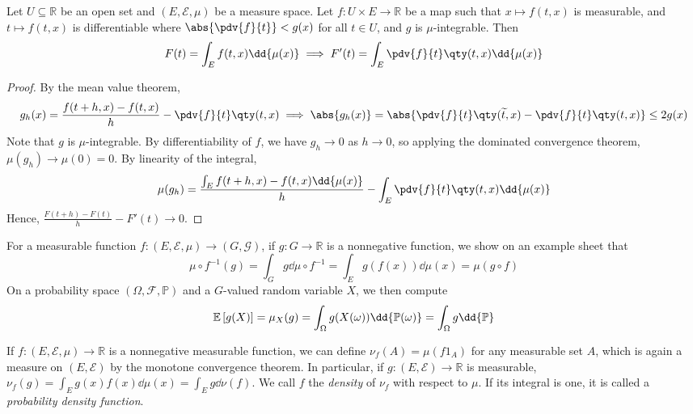 \begin{theorem}
	Let $U \subseteq \mathbb R$ be an open set and $(E, \mathcal E, \mu)$ be a measure space.
	Let $f \colon U \times E \to \mathbb R$ be a map such that $x \mapsto f(t, x)$ is measurable, and $t \mapsto f(t,x)$ is differentiable where $\abs{\pdv{f}{t}} < g(x)$ for all $t \in U$, and $g$ is $\mu$-integrable.
	Then
	\[ F(t) = \int_E f(t,x) \dd{\mu(x)} \implies F'(t) = \int_E \pdv{f}{t}\qty(t,x) \dd{\mu(x)} \]
\end{theorem}
\begin{proof}
	By the mean value theorem,
	\[ g_h(x) = \frac{f(t + h, x) - f(t, x)}{h} - \pdv{f}{t}\qty(t,x) \implies \abs{g_h(x)} = \abs{\pdv{f}{t}\qty(\widetilde t, x) - \pdv{f}{t}\qty(t, x)} \leq 2g(x) \]
	Note that $g$ is $\mu$-integrable.
	By differentiability of $f$, we have $g_h \to 0$ as $h \to 0$, so applying the dominated convergence theorem, $\mu(g_h) \to \mu(0) = 0$.
	By linearity of the integral,
	\[ \mu(g_h) = \frac{\int_E f(t + h, x) - f(t, x) \dd{\mu(x)}}{h} - \int_E \pdv{f}{t}\qty(t,x) \dd{\mu(x)} \]
	Hence, $\frac{F(t+h) - F(t)}{h} - F'(t) \to 0$.
\end{proof}
\begin{example}
	For a measurable function $f \colon (E, \mathcal E, \mu) \to (G, \mathcal G)$, if $g \colon G \to \mathbb R$ is a nonnegative function, we show on an example sheet that
	\[ \mu \circ f^{-1}(g) = \int_G g \dd{\mu\circ f^{-1}} = \int_E g(f(x)) \dd{\mu(x)} = \mu(g \circ f) \]
	On a probability space $(\Omega, \mathcal F, \mathbb P)$ and a $G$-valued random variable $X$, we then compute
	\[ \expect{g(X)} = \mu_X(g) = \int_\Omega g(X(\omega)) \dd{\mathbb P(\omega)} = \int_\Omega g \dd{\mathbb {P}} \]
\end{example}
\begin{example}
	If $f \colon (E, \mathcal E, \mu) \to \mathbb R$ is a nonnegative measurable function, we can define $\nu_f(A) = \mu(f 1_A)$ for any measurable set $A$, which is again a measure on $(E, \mathcal E)$ by the monotone convergence theorem.
	In particular, if $g \colon (E, \mathcal E) \to \mathbb R$ is measurable, $\nu_f(g) = \int_E g(x) f(x) \dd{\mu(x)} = \int_E g \dd{\nu(f)}$.
	We call $f$ the \emph{density} of $\nu_f$ with respect to $\mu$.
	If its integral is one, it is called a \emph{probability density function}.
\end{example}
